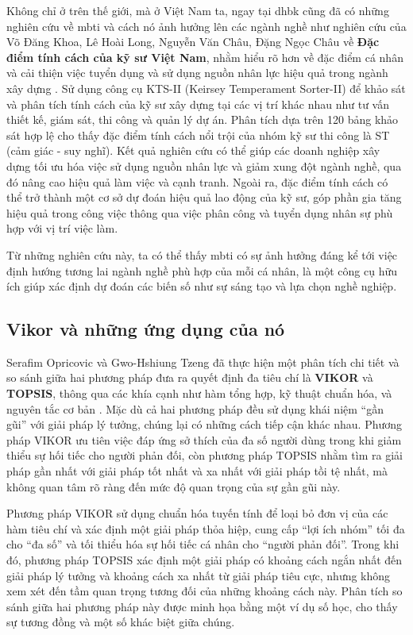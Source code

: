 Không chỉ ở trên thế giới, mà ở Việt Nam ta, ngay tại \acrlong{dhbk} cũng đã có những nghiên cứu về \acrshort{mbti} và cách nó ảnh hưởng lên các ngành nghề như nghiên cứu của Võ Đăng Khoa, Lê Hoài Long, Nguyễn Văn Châu, Đặng Ngọc Châu về \textbf{Đặc điểm tính cách của kỹ sư Việt Nam}, nhằm hiểu rõ hơn về đặc điểm cá nhân và cải thiện việc tuyển dụng và sử dụng nguồn nhân lực hiệu quả trong ngành xây dựng \cite{khoa}.  Sử dụng công cụ KTS-II (Keirsey Temperament Sorter-II) để khảo sát và phân tích tính cách của kỹ sư xây dựng tại các vị trí khác nhau như tư vấn thiết kế, giám sát, thi công và quản lý dự án. Phân tích dựa trên 120 bảng khảo sát hợp lệ cho thấy đặc điểm tính cách nổi trội của nhóm kỹ sư thi công là ST (cảm giác - suy nghĩ). Kết quả nghiên cứu có thể giúp các doanh nghiệp xây dựng tối ưu hóa việc sử dụng nguồn nhân lực và giảm xung đột ngành nghề, qua đó nâng cao hiệu quả làm việc và cạnh tranh. Ngoài ra, đặc điểm tính cách có thể trở thành một cơ sở dự đoán hiệu quả lao động của kỹ sư, góp phần gia tăng hiệu  quả trong công việc thông qua việc phân công và tuyển dụng nhân sự phù hợp với vị trí việc làm.

Từ những nghiên cứu này, ta có thể thấy \acrshort{mbti} có sự ảnh hưởng đáng kể tới việc định hướng tương lai ngành nghề phù hợp của mỗi cá nhân, là một công cụ hữu ích giúp xác định dự đoán các biến số như sự sáng tạo và lựa chọn nghề nghiệp.

\subsection{Vikor và những ứng dụng của nó}
Serafim Opricovic và Gwo-Hshiung Tzeng đã thực hiện một phân tích chi tiết và so sánh giữa hai phương pháp đưa ra quyết định đa tiêu chí là \textbf{VIKOR} và \textbf{TOPSIS}, thông qua các khía cạnh như hàm tổng hợp, kỹ thuật chuẩn hóa, và nguyên tắc cơ bản \cite{serafim}. Mặc dù cả hai phương pháp đều sử dụng khái niệm ``gần gũi” với giải pháp lý tưởng, chúng lại có những cách tiếp cận khác nhau. Phương pháp VIKOR ưu tiên việc đáp ứng sở thích của đa số người dùng trong khi giảm thiểu sự hối tiếc cho người phản đối, còn phương pháp TOPSIS nhằm tìm ra giải pháp gần nhất với giải pháp tốt nhất và xa nhất với giải pháp tồi tệ nhất, mà không quan tâm rõ ràng đến mức độ quan trọng của sự gần gũi này.

Phương pháp VIKOR sử dụng chuẩn hóa tuyến tính để loại bỏ đơn vị của các hàm tiêu chí và xác định một giải pháp thỏa hiệp, cung cấp “lợi ích nhóm” tối đa cho “đa số” và tối thiểu hóa sự hối tiếc cá nhân cho “người phản đối”. Trong khi đó, phương pháp TOPSIS xác định một giải pháp có khoảng cách ngắn nhất đến giải pháp lý tưởng và khoảng cách xa nhất từ giải pháp tiêu cực, nhưng không xem xét đến tầm quan trọng tương đối của những khoảng cách này. Phân tích so sánh giữa hai phương pháp này được minh họa bằng một ví dụ số học, cho thấy sự tương đồng và một số khác biệt giữa chúng.

